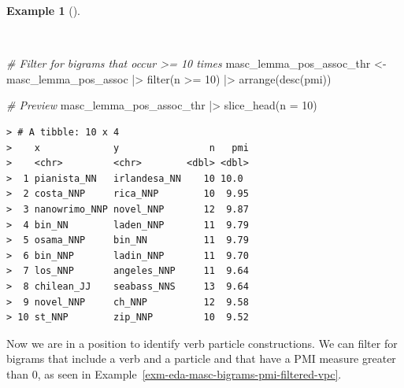 \documentclass[
  letterpaper,
  DIV=11,
  numbers=noendperiod]{scrreport}
\newenvironment{Shaded}{\begin{snugshade}}{\end{snugshade}}
\newcommand{\AttributeTok}[1]{\textcolor[rgb]{0.00,0.00,0.00}{#1}}
\newcommand{\CommentTok}[1]{\textcolor[rgb]{0.00,0.00,0.00}{\textit{#1}}}
\newcommand{\DecValTok}[1]{\textcolor[rgb]{0.00,0.00,0.00}{#1}}
\newcommand{\FunctionTok}[1]{\textcolor[rgb]{0.00,0.00,0.00}{#1}}
\newcommand{\NormalTok}[1]{\textcolor[rgb]{0.00,0.00,0.00}{#1}}
\newcommand{\OtherTok}[1]{\textcolor[rgb]{0.00,0.00,0.00}{#1}}
\newcommand{\SpecialCharTok}[1]{\textcolor[rgb]{0.00,0.00,0.00}{#1}}
\theoremstyle{definition}
\newtheorem{example}{Example}[chapter]
\theoremstyle{remark}
\begin{document}
\begin{example}[]\protect\hypertarget{exm-eda-masc-bigrams-pmi-filtered}{}\label{exm-eda-masc-bigrams-pmi-filtered}

~

\begin{Shaded}
\begin{Highlighting}[]
\CommentTok{\# Filter for bigrams that occur \textgreater{}= 10 times}
\NormalTok{masc\_lemma\_pos\_assoc\_thr }\OtherTok{\textless{}{-}} 
\NormalTok{  masc\_lemma\_pos\_assoc }\SpecialCharTok{|\textgreater{}} 
  \FunctionTok{filter}\NormalTok{(n }\SpecialCharTok{\textgreater{}=} \DecValTok{10}\NormalTok{) }\SpecialCharTok{|\textgreater{}} 
  \FunctionTok{arrange}\NormalTok{(}\FunctionTok{desc}\NormalTok{(pmi))}

\CommentTok{\# Preview}
\NormalTok{masc\_lemma\_pos\_assoc\_thr }\SpecialCharTok{|\textgreater{}} 
  \FunctionTok{slice\_head}\NormalTok{(}\AttributeTok{n =} \DecValTok{10}\NormalTok{)}
\end{Highlighting}
\end{Shaded}

\begin{verbatim}
> # A tibble: 10 x 4
>    x             y                n   pmi
>    <chr>         <chr>        <dbl> <dbl>
>  1 pianista_NN   irlandesa_NN    10 10.0 
>  2 costa_NNP     rica_NNP        10  9.95
>  3 nanowrimo_NNP novel_NNP       12  9.87
>  4 bin_NN        laden_NNP       11  9.79
>  5 osama_NNP     bin_NN          11  9.79
>  6 bin_NNP       ladin_NNP       11  9.70
>  7 los_NNP       angeles_NNP     11  9.64
>  8 chilean_JJ    seabass_NNS     13  9.64
>  9 novel_NNP     ch_NNP          12  9.58
> 10 st_NNP        zip_NNP         10  9.52
\end{verbatim}

\end{example}

Now we are in a position to identify verb particle constructions. We can
filter for bigrams that include a verb and a particle and that have a
PMI measure greater than 0, as seen in
Example~\ref{exm-eda-masc-bigrams-pmi-filtered-vpc}.
\end{document}
